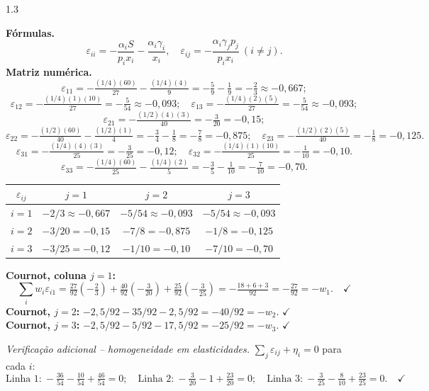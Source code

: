 \documentclass[11pt,addpoints]{exam}
\begin{document}
\begin{spacing}{1.3}
\begin{questions}
\begin{parts}
\begin{solution}
\textbf{Fórmulas.}
\[
    \varepsilon_{ii} = -\frac{\alpha_i S}{p_i x_i} - \frac{\alpha_i \gamma_i}{x_i},\quad
    \varepsilon_{ij} = -\frac{\alpha_i \gamma_j p_j}{p_i x_i}\ (i\neq j).
\]
\textbf{Matriz numérica.}
\[
    \varepsilon_{11} = -\tfrac{(1/4)(60)}{27} - \tfrac{(1/4)(4)}{9} = -\tfrac{5}{9} - \tfrac{1}{9} = -\tfrac{2}{3} \approx -0{,}667;
\]
\[
    \varepsilon_{12} = -\tfrac{(1/4)(1)(10)}{27} = -\tfrac{5}{54} \approx -0{,}093;\quad
    \varepsilon_{13} = -\tfrac{(1/4)(2)(5)}{27} = -\tfrac{5}{54} \approx -0{,}093;
\]
\[
    \varepsilon_{21} = -\tfrac{(1/2)(4)(3)}{40} = -\tfrac{3}{20} = -0{,}15;
\]
\[
    \varepsilon_{22} = -\tfrac{(1/2)(60)}{40} - \tfrac{(1/2)(1)}{4} = -\tfrac{3}{4} - \tfrac{1}{8} = -\tfrac{7}{8} = -0{,}875;\quad
    \varepsilon_{23} = -\tfrac{(1/2)(2)(5)}{40} = -\tfrac{1}{8} = -0{,}125.
\]
\[
    \varepsilon_{31} = -\tfrac{(1/4)(4)(3)}{25} = -\tfrac{3}{25} = -0{,}12;\quad
    \varepsilon_{32} = -\tfrac{(1/4)(1)(10)}{25} = -\tfrac{1}{10} = -0{,}10.
\]
\[
    \varepsilon_{33} = -\tfrac{(1/4)(60)}{25} - \tfrac{(1/4)(2)}{5} = -\tfrac{3}{5} - \tfrac{1}{10} = -\tfrac{7}{10} = -0{,}70.
\]
\begin{center}
\renewcommand{\arraystretch}{1.2}
\begin{tabular}{c|ccc}
\toprule
$\varepsilon_{ij}$ & $j = 1$ & $j = 2$ & $j = 3$ \\
\midrule
$i = 1$ & $-2/3 \approx -0{,}667$ & $-5/54 \approx -0{,}093$ & $-5/54 \approx -0{,}093$ \\
$i = 2$ & $-3/20 = -0{,}15$ & $-7/8 = -0{,}875$ & $-1/8 = -0{,}125$ \\
$i = 3$ & $-3/25 = -0{,}12$ & $-1/10 = -0{,}10$ & $-7/10 = -0{,}70$ \\
\bottomrule
\end{tabular}
\end{center}

\textbf{Cournot, coluna $j=1$:}
\[
    \sum_i w_i \varepsilon_{i1} = \tfrac{27}{92}(-\tfrac{2}{3}) + \tfrac{40}{92}(-\tfrac{3}{20}) + \tfrac{25}{92}(-\tfrac{3}{25}) = -\tfrac{18 + 6 + 3}{92} = -\tfrac{27}{92} = -w_1. \quad \checkmark
\]
\textbf{Cournot, $j=2$:} $-2{,}5/92 - 35/92 - 2{,}5/92 = -40/92 = -w_2$. $\checkmark$ \\
\textbf{Cournot, $j=3$:} $-2{,}5/92 - 5/92 - 17{,}5/92 = -25/92 = -w_3$. $\checkmark$

\textit{Verificação adicional -- homogeneidade em elasticidades.} $\sum_j \varepsilon_{ij} + \eta_i = 0$ para cada $i$:
\[
\text{Linha 1:}\ -\tfrac{36}{54} - \tfrac{10}{54} + \tfrac{46}{54} = 0;\quad
\text{Linha 2:}\ -\tfrac{3}{20} - 1 + \tfrac{23}{20} = 0;\quad
\text{Linha 3:}\ -\tfrac{3}{25} - \tfrac{8}{10} + \tfrac{23}{25} = 0. \quad \checkmark
\]
\end{solution}


\end{parts}
\end{questions}
\end{spacing}
\end{document}
